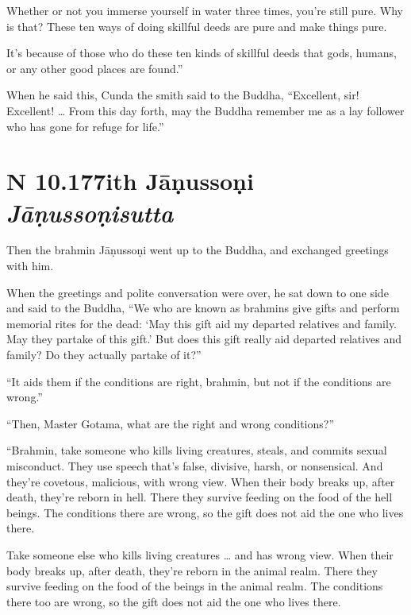 \documentclass[12pt,openany]{book}%
\newcommand*{\suttatitleacronym}[1]{\smaller[2]{#1}\vspace*{.3em}}
\newcommand*{\suttatitletranslation}[1]{\linebreak{#1}}
\newcommand*{\suttatitleroot}[1]{\linebreak\smaller[2]\itshape{#1}}
\newcommand*{\tocacronym}[1]{\hspace*{-3.3em}{#1}\quad}
\newcommand*{\toctranslation}[1]{#1}
\newcommand*{\tocroot}[1]{(\textit{#1})}
\begin{document}
Whether or not you immerse yourself in water three times, you’re still pure. Why is that? These ten ways of doing skillful deeds are pure and make things pure. 

It’s because of those who do these ten kinds of skillful deeds that gods, humans, or any other good places are found.” 

When he said this, Cunda the smith said to the Buddha, “Excellent, sir! Excellent! … From this day forth, may the Buddha remember me as a lay follower who has gone for refuge for life.” 

%
\section*{{\suttatitleacronym AN 10.177}{\suttatitletranslation With Jāṇussoṇi }{\suttatitleroot Jāṇussoṇisutta}}
\addcontentsline{toc}{section}{\tocacronym{AN 10.177} \toctranslation{With Jāṇussoṇi } \tocroot{Jāṇussoṇisutta}}

Then the brahmin \textsanskrit{Jāṇussoṇi} went up to the Buddha, and exchanged greetings with him. 

When the greetings and polite conversation were over, he sat down to one side and said to the Buddha, “We who are known as brahmins give gifts and perform memorial rites for the dead: ‘May this gift aid my departed relatives and family. May they partake of this gift.’ But does this gift really aid departed relatives and family? Do they actually partake of it?” 

“It aids them if the conditions are right, brahmin, but not if the conditions are wrong.” 

“Then, Master Gotama, what are the right and wrong conditions?” 

“Brahmin, take someone who kills living creatures, steals, and commits sexual misconduct. They use speech that’s false, divisive, harsh, or nonsensical. And they’re covetous, malicious, with wrong view. When their body breaks up, after death, they’re reborn in hell. There they survive feeding on the food of the hell beings. The conditions there are wrong, so the gift does not aid the one who lives there. 

Take someone else who kills living creatures … and has wrong view. When their body breaks up, after death, they’re reborn in the animal realm. There they survive feeding on the food of the beings in the animal realm. The conditions there too are wrong, so the gift does not aid the one who lives there. 
\end{document}

